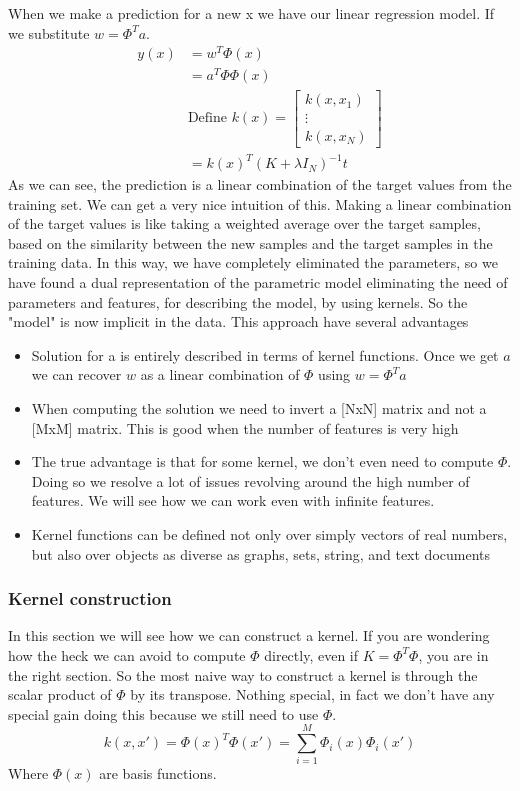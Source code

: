 \documentclass[main.tex]{subfiles}
\begin{document}
When we make a prediction for a new x we have our linear regression model. If we substitute $w=\Phi^Ta$.
\begin{align*}
    y(x) & = w^T\Phi(x)                      \\
         & = a^T\Phi \Phi(x)                 \\
         & \text{Define }k(x)=
    \begin{bmatrix}
        k(x,x_1) \\
        \vdots   \\
        k(x,x_N)
    \end{bmatrix}                           \\
         & = k(x)^T (K + \lambda I_N)^{-1} t
\end{align*}
As we can see, the prediction is a linear combination of the target values from the training set. We can get a very nice intuition of this. Making a linear combination of the target values is like taking a weighted average over the target samples, based on the similarity between the new samples and the target samples in the training data. In this way, we have completely eliminated the parameters, so we have found a dual representation of the parametric model eliminating the need of parameters and features, for describing the model, by using kernels. So the "model" is now implicit in the data.
This approach have several advantages
\begin{itemize}
    \item Solution for a is entirely described in terms of kernel functions. Once we get $a$ we can recover $w$ as a linear combination of $\Phi$ using $w = \Phi^T a$
    \item When computing the solution we need to invert a [NxN] matrix and not a [MxM] matrix. This is good when the number of features is very high
    \item The true advantage is that for some kernel, we don't even need to compute $\Phi$. Doing so we resolve a lot of issues revolving around the high number of features. We will see how we can work even with infinite features.
    \item Kernel functions can be defined not only over simply vectors of real numbers, but also over objects as diverse as graphs, sets, string, and text documents
\end{itemize}

\subsubsection{Kernel construction}
In this section we will see how we can construct a kernel. If you are wondering how the heck we can avoid to compute $\Phi$ directly, even if $K=\Phi^T \Phi$, you are in the right section.
So the most naive way to construct a kernel is through the scalar product of $\Phi$ by its transpose. Nothing special, in fact we don't have any special gain doing this because we still need to use $\Phi$.
\begin{equation*}
    k(x,x') = \Phi(x)^T \Phi(x') = \sum_{i=1}^M \Phi_i(x) \Phi_i(x')
\end{equation*}
Where $\Phi(x)$ are basis functions.
\end{document}
